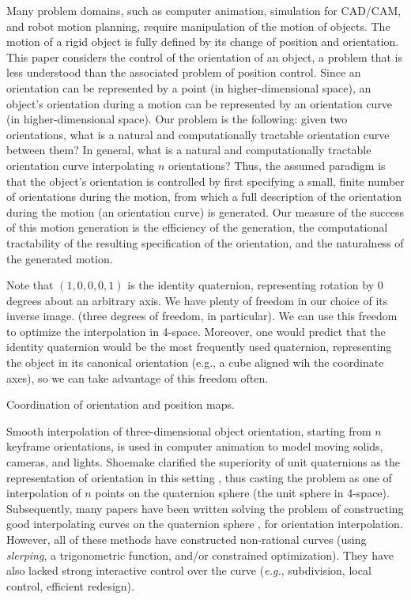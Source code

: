 Many problem domains, such as computer animation, simulation for CAD/CAM, 
and robot motion planning, require manipulation of the motion of objects.
The motion of a rigid object is fully defined by its change of position
and orientation.
This paper considers the control of the orientation of an object,
a problem that is less understood than the associated problem
of position control.
Since an orientation can be represented by a point (in higher-dimensional
space), an object's orientation during a motion can be represented by
an orientation curve (in higher-dimensional space).
Our problem is the following: given two orientations, what is
a natural and computationally tractable orientation curve between them?
In general, what is a natural and computationally tractable orientation curve
interpolating $n$ orientations?
Thus, the assumed paradigm is that the object's orientation is controlled
by first specifying a small, finite number of orientations during the motion,
from which a full description of the orientation during the motion (an
orientation curve) is generated.
Our measure of the success of this motion generation is the
efficiency of the generation, the computational tractability of the
resulting specification of the orientation, and the naturalness
of the generated motion.

Note that $(1,0,0,0,1)$ is the identity quaternion, representing rotation by
0 degrees about an arbitrary axis.
We have plenty of freedom in our choice of its inverse image.
(three degrees of freedom, in particular).
We can use this freedom to optimize the interpolation in 4-space.
Moreover, one would predict that the identity quaternion would 
be the most frequently used quaternion, representing the object
in its canonical orientation (e.g., a cube aligned wih the coordinate
axes), so we can take advantage of this freedom often.

Coordination of orientation and position maps.

\clearpage

Smooth interpolation of three-dimensional object orientation,
starting from $n$ keyframe orientations, is used in computer animation
to model moving solids, cameras, and lights.
Shoemake clarified the superiority of unit quaternions as the
representation of orientation in this setting \cite{shoemake85},
thus casting the problem as one of interpolation of $n$ points on
the quaternion sphere (the unit sphere in 4-space).
Subsequently, many papers have been written solving the problem of
constructing good interpolating curves on the quaternion sphere
\cite{shoemake85,duff85,gabriel85,pletinckx89,schlag91,barr92},
for orientation interpolation.
However, all of these methods have constructed non-rational curves
(using {\em slerping}, a trigonometric function, and/or
constrained optimization).
They have also lacked strong interactive control over the curve
({\em e.g.}, subdivision, local control, efficient redesign).

